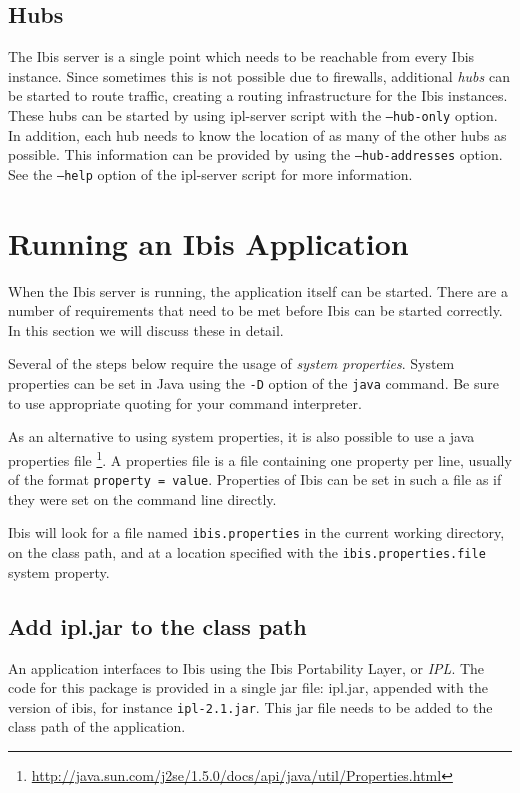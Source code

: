 \documentclass[a4paper,10pt]{article}
\begin{document}
\subsection{Hubs}
\label{hubs}

The Ibis server is a single point which needs to be reachable from every
Ibis instance. Since sometimes this is not possible due to firewalls,
additional \emph{hubs} can be started to route traffic, creating a
routing infrastructure for the Ibis instances. These hubs can be started
by using ipl-server script with the \texttt{--hub-only} option. In
addition, each hub needs to know the location of as many of the other
hubs as possible. This information can be provided by using the
\texttt{--hub-addresses} option. See the \texttt{--help} option of the
ipl-server script for more information.

\section{Running an Ibis Application}

When the Ibis server is running, the application itself can be
started. There are a number of requirements that need to be met before 
Ibis can be started correctly. In this section we will discuss these in detail.

Several of the steps below require the usage of \emph{system properties}. 
System properties can be set in Java using the \texttt{-D} option of the 
\texttt{java} command. Be sure to use appropriate quoting for your
command interpreter.

As an alternative to using system properties, it is also possible to use
a java properties file
\footnote{\url{http://java.sun.com/j2se/1.5.0/docs/api/java/util/Properties.html}}.
A properties file is a file containing one property per line, usually of
the format \texttt{property = value}. Properties of Ibis can be set in
such a file as if they were set on the command line directly.

Ibis will look for a file named \texttt{ibis.properties} in the current working
directory, on the class path, and at a location specified with the
\texttt{ibis.properties.file} system property.

\subsection{Add ipl.jar to the class path}

An application interfaces to Ibis using the Ibis Portability Layer, or
\emph{IPL}. The code for this package is provided in a single jar file:
ipl.jar, appended with the version of ibis, for instance \texttt{ipl-2.1.jar}.
This jar file needs to be added to the class path of the application.
\end{document}
